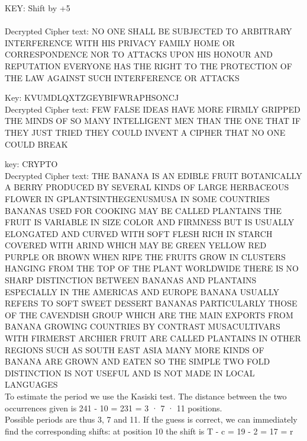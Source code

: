 \documentclass[12pt,a4paper]{article}
\begin{document}
\frontpart

 \exercise
KEY: Shift by +5\\\\
Decrypted Cipher text: NO ONE SHALL BE SUBJECTED TO ARBITRARY INTERFERENCE WITH HIS PRIVACY FAMILY HOME OR CORRESPONDENCE NOR TO ATTACKS UPON HIS HONOUR AND REPUTATION EVERYONE HAS THE RIGHT TO THE PROTECTION OF THE LAW AGAINST SUCH INTERFERENCE OR ATTACKS	

 \exercise

 	Key: KVUMDLQXTZGEYBIFWRAPHSONCJ \\
 	\newline
 	Decrypted Cipher text: FEW FALSE IDEAS HAVE MORE FIRMLY GRIPPED THE MINDS OF SO MANY INTELLIGENT MEN THAN THE ONE THAT IF THEY JUST TRIED THEY COULD INVENT A CIPHER THAT NO ONE COULD BREAK

 \exercise

 \noindent key: CRYPTO\\
Decrypted Cipher text: THE BANANA IS AN EDIBLE FRUIT BOTANICALLY A BERRY PRODUCED BY SEVERAL KINDS OF LARGE HERBACEOUS FLOWER IN GPLANTSINTHEGENUSMUSA IN SOME COUNTRIES BANANAS 
	USED FOR COOKING MAY BE CALLED PLANTAINS THE FRUIT IS VARIABLE IN SIZE COLOR AND FIRMNESS BUT IS USUALLY ELONGATED AND CURVED WITH SOFT FLESH RICH IN STARCH
	COVERED WITH ARIND WHICH MAY BE GREEN YELLOW RED PURPLE OR BROWN WHEN RIPE THE FRUITS GROW IN CLUSTERS HANGING FROM THE TOP OF THE PLANT WORLDWIDE
	THERE IS NO SHARP DISTINCTION BETWEEN BANANAS AND PLANTAINS ESPECIALLY IN THE AMERICAS AND EUROPE BANANA USUALLY REFERS TO SOFT SWEET DESSERT BANANAS 
	PARTICULARLY THOSE OF THE CAVENDISH GROUP WHICH ARE THE MAIN EXPORTS FROM BANANA GROWING COUNTRIES BY CONTRAST MUSACULTIVARS WITH FIRMERST ARCHIER FRUIT ARE CALLED 
	PLANTAINS IN OTHER REGIONS SUCH AS SOUTH EAST ASIA MANY MORE KINDS OF BANANA ARE GROWN AND EATEN SO THE SIMPLE TWO FOLD DISTINCTION IS NOT USEFUL AND IS NOT 
	MADE IN LOCAL LANGUAGES \\




 \exercise
 To estimate the period we use the Kasiski test. The distance between the two occurrences  given is
 241 - 10 = 231 = 3 · 7 · 11  positions.\\

 Possible periods are thus 3, 7 and 11. If the guess is correct, we can immediately find the
 corresponding shifts: at position 10 the shift is T - c = 19 - 2 = 17 = r\\
 
\end{document}
